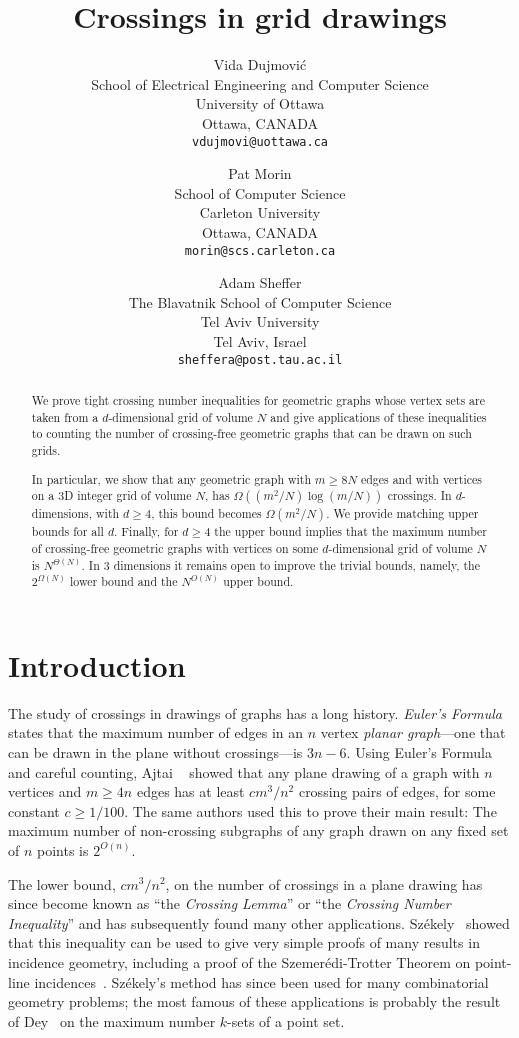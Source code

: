 \documentclass[12pt]{article}
\title{\bf Crossings in grid drawings}
\author{%
  Vida Dujmovi\'c\\
    \small School of Electrical Engineering and Computer Science\\[-0.8ex]
    \small University of Ottawa\\[-0.8ex]
    \small Ottawa, CANADA \\
    \small\tt vdujmovi@uottawa.ca\\
  \and
  Pat Morin\\
    \small School of Computer Science\\[-0.8ex]
    \small Carleton University\\[-0.8ex]
    \small Ottawa, CANADA \\
    \small\tt morin@scs.carleton.ca\\
  \and
  Adam Sheffer\\
    \small The Blavatnik School of Computer Science\\[-0.8ex]
    \small Tel Aviv University\\[-0.8ex]
    \small Tel Aviv, Israel \\
    \small\tt sheffera@post.tau.ac.il\\
}
\newcommand{\n}{N}
\begin{document}
\maketitle

\begin{abstract}
  We prove tight crossing number inequalities for geometric graphs whose
  vertex sets are taken from a $d$-dimensional grid of volume $\n$
  and give applications of these inequalities to counting the number
  of crossing-free geometric graphs that can be drawn on such grids.

  In particular, we show that any geometric graph with $m\geq 8N$
  edges and with vertices on a 3D integer grid of volume $N$, has
  $\Omega((m^2/N)\log(m/N))$ crossings. In $d$-dimensions, with $d\ge 4$,
  this bound becomes $\Omega(m^2/N)$. We provide matching upper bounds
  for all $d$. Finally, for $d\ge 4$ the upper bound implies that the
  maximum number of crossing-free geometric graphs with vertices on some
  $d$-dimensional grid of volume $N$ is $N^{\Theta(N)}$. In 3 dimensions
  it remains open to improve the trivial bounds, namely, the $2^{\Omega(N)}$
  lower bound and the $N^{O(N)}$ upper bound.
\end{abstract}



\section{Introduction}

The study of crossings in drawings of graphs has a long history.
\emph{Euler's Formula} states that the maximum number of edges in an $n$
vertex \emph{planar graph}---one that can be drawn in the plane without
crossings---is $3n-6$.  Using Euler's Formula and careful counting, Ajtai
\etal~\cite{ajtai.chvatal.ea:crossing-free} showed that any plane drawing
of a graph with $n$ vertices and $m\ge 4n$ edges has at least $c m^3/n^2$
crossing pairs of edges, for some constant $c\ge 1/100$.  The same authors
used this to prove their main result: The maximum number of non-crossing
subgraphs of any graph drawn on any fixed set of $n$ points is $2^{O(n)}$.

The lower bound, $cm^3/n^2$, on the number of crossings in a plane
drawing has since become known as ``the \emph{Crossing Lemma}''
or ``the \emph{Crossing Number Inequality}'' and has subsequently found many
other applications.  Sz\'ekely~\cite{szekely:crossing} showed that
this inequality can be used to give very simple proofs of many results
in incidence geometry, including a proof of the Szemer\'edi-Trotter
Theorem on point-line incidences~\cite{szemeredi.trotter:extremal}.
Sz\'ekely's method has since been used for many combinatorial geometry
problems; the most famous of these applications is probably the result
of Dey~\cite{dey:improved} on the maximum number $k$-sets of a point set.
\end{document}
